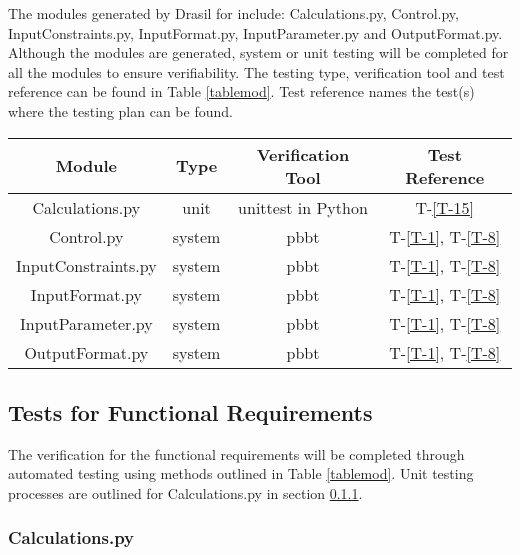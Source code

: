 \documentclass[12pt, titlepage]{article}
\newcommand{\tinref}[1]{T-\ref{#1}}
\begin{document}
The modules generated by Drasil for \progname{} include: Calculations.py, 
Control.py, InputConstraints.py, InputFormat.py, InputParameter.py and 
OutputFormat.py. Although the modules are generated, system or unit testing will 
be completed for all the modules to ensure verifiability. The testing type, 
verification tool and test reference can be found in Table \ref{tablemod}. Test 
reference names the test(s) where the testing plan can be found.

\begin{center}
 \begin{tabular}{||c|c|c|c||} 
 \hline
 Module & Type & Verification Tool & Test Reference \\ [0.5ex] 
 \hline
  Calculations.py & unit & unittest in Python & \tinref{T-15}\\
  \hline
  Control.py & system & pbbt & \tinref{T-1}, \tinref{T-8}\\
  \hline
  InputConstraints.py & system & pbbt & \tinref{T-1}, \tinref{T-8}\\
  \hline
  InputFormat.py & system & pbbt & \tinref{T-1}, \tinref{T-8}\\
  \hline
  InputParameter.py & system & pbbt & \tinref{T-1}, \tinref{T-8}\\
  \hline
  OutputFormat.py & system & pbbt & \tinref{T-1}, \tinref{T-8}\\
 \hline
\end{tabular}
\label{tablemod}

\end{center}	


\subsection{Tests for Functional Requirements}\label{utnfr}

The verification for the functional requirements will be completed through 
automated testing using methods outlined in Table \ref{tablemod}. Unit testing 
processes are outlined for Calculations.py in section \ref{modcalc}.

\subsubsection{Calculations.py}\label{modcalc}
\end{document}
